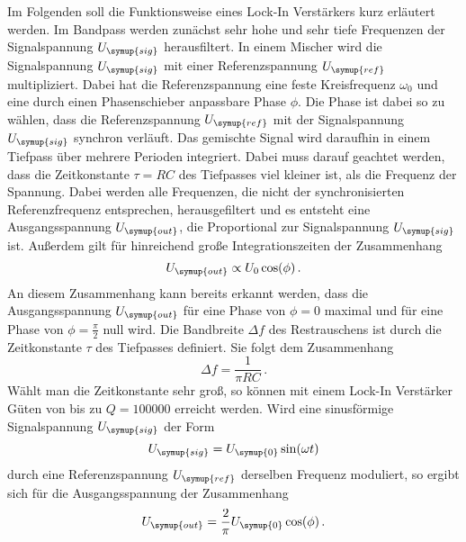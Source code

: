 Im Folgenden soll die Funktionsweise eines Lock-In Verstärkers kurz erläutert
werden. Im Bandpass werden zunächst sehr hohe und sehr tiefe Frequenzen der
Signalspannung $U_{\symup{sig}}$ herausfiltert. In einem Mischer wird die
Signalspannung $U_{\symup{sig}}$ mit einer Referenzspannung $U_{\symup{ref}}$
multipliziert. Dabei hat die Referenzspannung eine feste Kreisfrequenz
$\omega_0$ und eine durch einen Phasenschieber anpassbare Phase $\phi$. Die Phase
ist dabei so zu wählen, dass die Referenzspannung $U_{\symup{ref}}$ mit der
Signalspannung $U_{\symup{sig}}$ synchron verläuft. Das gemischte Signal wird
daraufhin in einem Tiefpass über mehrere Perioden integriert. Dabei muss darauf
geachtet werden, dass  die Zeitkonstante $\tau=RC$ des Tiefpasses viel kleiner
ist, als die Frequenz der Spannung. Dabei werden alle Frequenzen, die nicht
der synchronisierten Referenzfrequenz entsprechen, herausgefiltert und es entsteht
eine Ausgangsspannung $U_{\symup{out}}$, die Proportional zur Signalspannung
$U_{\symup{sig}}$ ist. Außerdem gilt für hinreichend große Integrationszeiten
der Zusammenhang
\begin{equation}
  U_{\symup{out}}\propto U_0 \cos(\phi) \,.
  \label{eqn:U_out_prop}
\end{equation}
An diesem Zusammenhang kann bereits erkannt werden, dass die Ausgangsspannung
$U_{\symup{out}}$ für eine Phase von $\phi=0$ maximal und für eine Phase von
$\phi=\frac{\pi}{2}$ null wird.
Die Bandbreite $\Delta f$ des Restrauschens ist durch die Zeitkonstante $\tau$ des Tiefpasses
definiert. Sie folgt dem Zusammenhang
\begin{equation}
  \Delta f=\frac{1}{\pi R C} \,.
  \label{eqn:bandbreite}
\end{equation}
Wählt man die Zeitkonstante sehr groß, so können mit einem Lock-In Verstärker Güten
von bis zu $Q=100000$ erreicht werden.
Wird eine sinusförmige Signalspannung $U_{\symup{sig}}$ der Form
\begin{equation}
  U_{\symup{sig}}=U_{\symup{0}}\sin(\omega t)
\end{equation}
durch eine Referenzspannung $U_{\symup{ref}}$ derselben Frequenz moduliert, so
ergibt sich für die Ausgangsspannung der Zusammenhang
\begin{equation}
  U_{\symup{out}}=\frac{2}{\pi}U_{\symup{0}}\cos(\phi)\,.
\end{equation}
